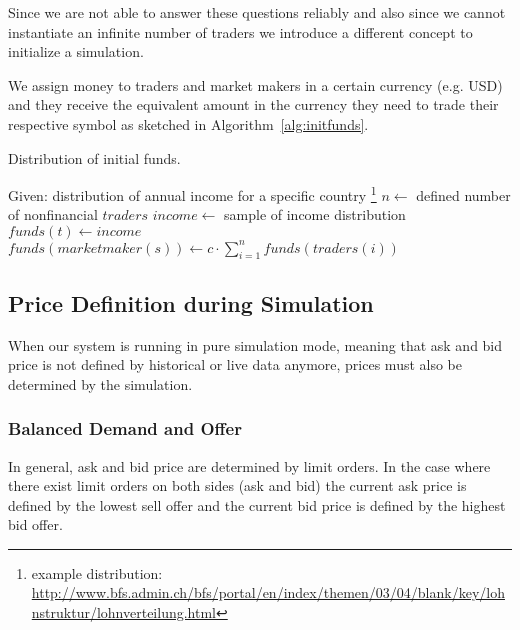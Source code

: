 Since we are not able to answer these questions reliably and also since we cannot
instantiate an infinite number of traders we introduce a different concept to
initialize a simulation.

We assign money to traders and market makers in a certain currency (e.g. USD) and 
they receive the equivalent amount in the currency they need to trade their respective
symbol as sketched in Algorithm~\ref{alg:initfunds}.

\begin{algorithm}
\caption{Distribution of initial funds.}
\label{alg:initfunds}
\begin{algorithmic}[1]
    \Statex Given: distribution of annual income for a specific country
    \footnote{example distribution: \url{http://www.bfs.admin.ch/bfs/portal/en/index/themen/03/04/blank/key/lohnstruktur/lohnverteilung.html}}
    \Statex
        \State  $n \gets$ defined number of nonfinancial $traders$
            \State $income \gets$ sample of income distribution
            \State $funds(t) \gets income$
        \EndFor
        \State $funds(marketmaker(s)) \gets c \cdot \sum_{i=1}^n funds(traders(i))$
    \EndFor
\end{algorithmic}
\end{algorithm}

%
%
%

\subsection{Price Definition during Simulation}

When our system is running in pure simulation mode, meaning that ask and bid price is
not defined by historical or live data anymore, prices must also be determined by the
simulation. 

\subsubsection{Balanced Demand and Offer}
In general, ask and bid price are determined by limit orders. In the case where there
exist limit orders on both sides (ask and bid) the current ask price is defined by the
lowest sell offer and the current bid price is defined by the highest bid offer.

